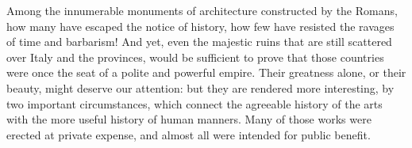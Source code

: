 
Among the innumerable monuments of architecture constructed by
the Romans, how many have escaped the notice of history, how few
have resisted the ravages of time and barbarism! And yet, even
the majestic ruins that are still scattered over Italy and the
provinces, would be sufficient to prove that those countries were
once the seat of a polite and powerful empire. Their greatness
alone, or their beauty, might deserve our attention: but they are
rendered more interesting, by two important circumstances, which
connect the agreeable history of the arts with the more useful
history of human manners. Many of those works were erected at
private expense, and almost all were intended for public benefit.

